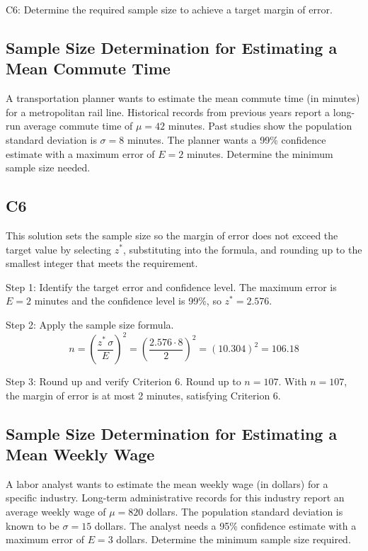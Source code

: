 

	
	\begin{ExamCriteria}
		\item C6: Determine the required sample size to achieve a target margin of error.
	\end{ExamCriteria}
	
	\begin{ExamProblems}
		\item
		\subsection*{Sample Size Determination for Estimating a Mean Commute Time}
		A transportation planner wants to estimate the mean commute time (in minutes) for a metropolitan rail line. Historical records from previous years report a long-run average commute time of $\mu = 42$ minutes. Past studies show the population standard deviation is $\sigma = 8$ minutes. The planner wants a 99\% confidence estimate with a maximum error of $E = 2$ minutes. Determine the minimum sample size needed.
		
		\subsection*{C6}
		This solution sets the sample size so the margin of error does not exceed the target value by selecting $z^*$, substituting into the formula, and rounding up to the smallest integer that meets the requirement.
		
		Step 1: Identify the target error and confidence level. The maximum error is $E = 2$ minutes and the confidence level is 99\%, so $z^* = 2.576$.
		
		Step 2: Apply the sample size formula.
		\[
		n = \left(\frac{z^*\,\sigma}{E}\right)^2
		= \left(\frac{2.576 \cdot 8}{2}\right)^2
		= \left(10.304\right)^2
		= 106.18
		\]
		
		Step 3: Round up and verify Criterion 6. Round up to $n = 107$. With $n=107$, the margin of error is at most 2 minutes, satisfying Criterion 6.
		
		\item
		\subsection*{Sample Size Determination for Estimating a Mean Weekly Wage}
		A labor analyst wants to estimate the mean weekly wage (in dollars) for a specific industry. Long-term administrative records for this industry report an average weekly wage of $\mu = 820$ dollars. The population standard deviation is known to be $\sigma = 15$ dollars. The analyst needs a 95\% confidence estimate with a maximum error of $E = 3$ dollars. Determine the minimum sample size required.
		

\end{ExamProblems}
